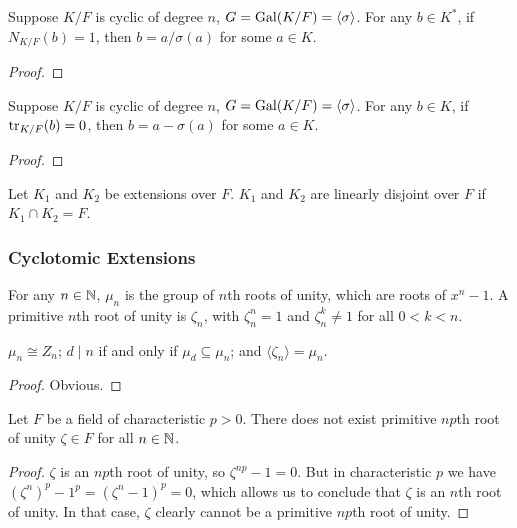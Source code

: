 \begin{theorem}
    Suppose \(K/F\) is cyclic of degree \(n\), \(G = \operatorname{Gal}(K/F) = \langle\sigma\rangle\).
    For any \(b \in K^\ast\), if \(N_{K/F}(b) = 1\),
    then \(b = a/\sigma(a)\) for some \(a \in K\).
\end{theorem}
\begin{proof}
\end{proof}
\begin{theorem}
    Suppose \(K/F\) is cyclic of degree \(n\), \(G = \operatorname{Gal}(K/F) = \langle\sigma\rangle\).
    For any \(b \in K\), if \(\tr_{K/F}(b) = 0\),
    then \(b = a - \sigma(a)\) for some \(a \in K\).
\end{theorem}
\begin{proof}
\end{proof}

\begin{definition}
    Let \(K_1\) and \(K_2\) be extensions over \(F\).
    \(K_1\) and \(K_2\) are linearly disjoint over \(F\)
    if \(K_1 \cap K_2 = F\).
\end{definition}

\subsubsection*{Cyclotomic Extensions}

\begin{definition}
    For any \(n \in \mathbb{N}\), \(\mu_n\) is the group of \(n\)th roots of unity,
    which are roots of \(x^n - 1\).
    A primitive \(n\)th root of unity is \(\zeta_n\),
    with \(\zeta_n^n = 1\) and \(\zeta_n^k \neq 1\) for all \(0 < k < n\).
\end{definition}
\begin{proposition}
    \(\mu_n \cong Z_n\);
    \(d \mid n\) if and only if \(\mu_d \subseteq \mu_n\);
    and \(\langle \zeta_n \rangle = \mu_n\).
\end{proposition}
\begin{proof}
    Obvious.
\end{proof}

\begin{proposition}
    Let \(F\) be a field of characteristic \(p > 0\).
    There does not exist primitive \(np\)th root of unity \(\zeta \in F\)
    for all \(n \in \mathbb{N}\).
\end{proposition}
\begin{proof}
    \(\zeta\) is an \(np\)th root of unity,
    so \(\zeta^{np} - 1 = 0\).
    But in characteristic \(p\) we have
    \({(\zeta^n)}^p - 1^p = {(\zeta^n - 1)}^p = 0\),
    which allows us to conclude that \(\zeta\) is an \(n\)th root of unity.
    In that case, \(\zeta\) clearly cannot be a primitive \(np\)th root of unity.
\end{proof}

